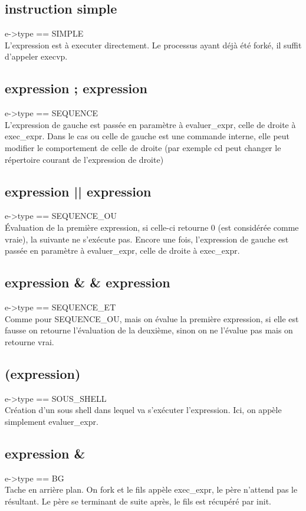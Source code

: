 \documentclass[12pt]{report}
\begin{document}
\subsection{instruction simple}
e->type == SIMPLE\\
L'expression est à executer directement.
Le processus ayant déjà été forké, il suffit d'appeler execvp.

\subsection{expression ; expression}
e->type == SEQUENCE\\
L'expression de gauche est passée en paramètre à evaluer\_expr, celle de droite à exec\_expr.
Dans le cas ou celle de gauche est une commande interne, elle peut modifier le comportement de celle de droite
(par exemple cd peut changer le répertoire courant de l'expression de droite)

\subsection{expression || expression}
e->type == SEQUENCE\_OU\\
Évaluation de la première expression, si celle-ci retourne 0 (est considérée comme vraie),
la suivante ne s'exécute pas. Encore une fois, l'expression de gauche est passée en paramètre à evaluer\_expr,
celle de droite à exec\_expr.

\subsection{expression \& \& expression}
e->type == SEQUENCE\_ET\\
Comme pour SEQUENCE\_OU, mais on évalue la première expression,
si elle est fausse on retourne l'évaluation de la deuxième, sinon on ne l'évalue pas mais on retourne vrai.

\subsection{(expression)}
e->type == SOUS\_SHELL\\
Création d'un sous shell dans lequel va s'exécuter l'expression. Ici, on appèle simplement evaluer\_expr.

\subsection{expression \&}
e->type == BG\\
Tache en arrière plan. On fork et le fils appèle exec\_expr, le père n'attend pas le résultant.
Le père se terminant de suite après, le fils est récupéré par init.
\end{document}
